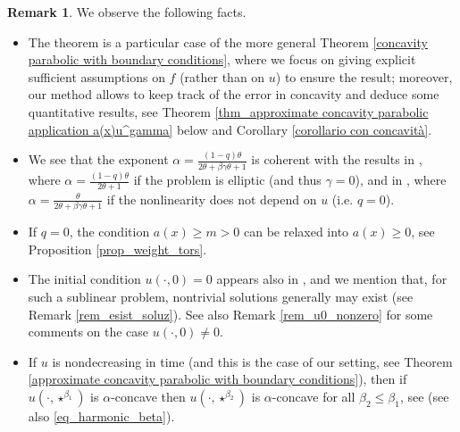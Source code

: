\documentclass[11pt, reqno]{amsart}
\theoremstyle{definition}
\newtheorem{remark}[lemma]{Remark}
\numberwithin{equation}{section}
\begin{document}
\begin{remark}
We observe the following facts.
\begin{itemize}
\item The theorem is a particular case of the more general Theorem \ref{concavity parabolic with boundary conditions}, where we focus on giving explicit sufficient assumptions on $f$ (rather than on $u$) to ensure the result;
moreover, our method allows to keep track of the error in concavity and deduce some quantitative results, see Theorem \ref{thm_approximate concavity parabolic application a(x)u^gamma} below and Corollary \ref{corollario con concavità}.
\item We see that the exponent $\alpha=\frac{(1-q)\theta}{2\theta +\beta \gamma \theta+1}$ is coherent with the results in \cite{kennington, GaSq24}, where $\alpha=\frac{(1-q)\theta}{2\theta+1}$ if the problem is elliptic (and thus $\gamma=0$), and in \cite{IsSa13, IsSa16}, where $\alpha = \frac{\theta}{2\theta+\beta\gamma \theta+1}$ if the nonlinearity does not depend on $u$ (i.e. $q=0$).
\item If $q=0$, the condition $a(x) \geq m>0$ can be relaxed into $a(x) \geq 0$, see Proposition \ref{prop_weight_tors}.
\item The initial condition $u(\cdot, 0)=0$ appears also in \cite{IsSa13, kenningtonparabolic, IsSa16}, and we mention that, for such a sublinear problem, nontrivial solutions generally may exist (see Remark \ref{rem_esist_soluz}). 
See also Remark \ref{rem_u0_nonzero} for some comments on the case $u(\cdot, 0)\neq 0$.
\item If $u$ is nondecreasing in time (and this is the case of our setting, see Theorem \ref{approximate concavity parabolic with boundary conditions}), then if $u(\cdot,\star^{\beta_1})$ is $\alpha$-concave then $u(\cdot,\star^{\beta_2})$ is $\alpha$-concave for all $\beta_2\leq \beta_1$, see \cite[Section 2, Property (e)]{IsSa13} (see also \eqref{eq_harmonic_beta}).
\end{itemize}
\end{remark}
\end{document}
